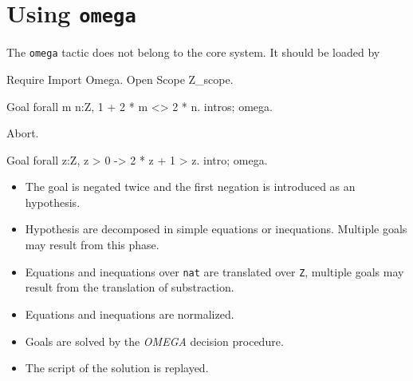 

\section{Using {\tt omega}}

The {\tt omega} tactic does not belong to the core system. It should be
loaded by
\begin{coq_example*}
Require Import Omega.
Open Scope Z_scope.
\end{coq_example*}

\example{}

\begin{coq_example}
Goal forall m n:Z, 1 + 2 * m <> 2 * n.
intros; omega.
\end{coq_example}
\begin{coq_eval}
Abort.
\end{coq_eval}

\example{}

\begin{coq_example}
Goal forall z:Z, z > 0 -> 2 * z + 1 > z.
intro; omega.
\end{coq_example}


\label{technical}

\begin{itemize}

\item The goal is negated twice and the first negation is introduced as an
     hypothesis.
\item Hypothesis are decomposed in simple equations or inequations. Multiple
     goals may result from this phase.
\item Equations and inequations over \verb=nat= are translated over
     \verb=Z=, multiple goals may result from the translation of
     substraction.
\item Equations and inequations are normalized.
\item Goals are solved by the {\it OMEGA} decision procedure.
\item The script of the solution is replayed.

\end{itemize}

